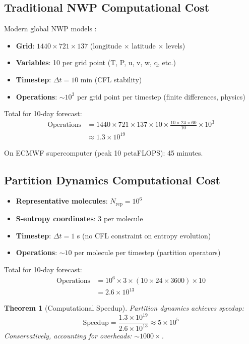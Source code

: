 \documentclass[twocolumn,10pt,a4paper]{article}
\newtheorem{theorem}{Theorem}[section]
\theoremstyle{definition}
\theoremstyle{remark}
\begin{document}
\subsection{Traditional NWP Computational Cost}

Modern global NWP models \cite{ecmwf2020ifs}:
\begin{itemize}
    \item \textbf{Grid}: $1440 \times 721 \times 137$ (longitude $\times$ latitude $\times$ levels)
    \item \textbf{Variables}: 10 per grid point (T, P, u, v, w, q, etc.)
    \item \textbf{Timestep}: $\Delta t = 10$ min (CFL stability)
    \item \textbf{Operations}: $\sim 10^3$ per grid point per timestep (finite differences, physics)
\end{itemize}

Total for 10-day forecast:
\begin{align}
    \text{Operations} &= 1440 \times 721 \times 137 \times 10 \times \frac{10 \times 24 \times 60}{10} \times 10^3 \\
    &\approx 1.3 \times 10^{19}
\end{align}

On ECMWF supercomputer (peak 10 petaFLOPS): 45 minutes.

\subsection{Partition Dynamics Computational Cost}

\begin{itemize}
    \item \textbf{Representative molecules}: $N_{\text{rep}} = 10^6$
    \item \textbf{S-entropy coordinates}: 3 per molecule
    \item \textbf{Timestep}: $\Delta t = 1$ s (no CFL constraint on entropy evolution)
    \item \textbf{Operations}: $\sim 10$ per molecule per timestep (partition operators)
\end{itemize}

Total for 10-day forecast:
\begin{align}
    \text{Operations} &= 10^6 \times 3 \times (10 \times 24 \times 3600) \times 10 \\
    &= 2.6 \times 10^{13}
\end{align}

\begin{theorem}[Computational Speedup]
\label{thm:speedup}
Partition dynamics achieves speedup:
\begin{equation}
    \text{Speedup} = \frac{1.3 \times 10^{19}}{2.6 \times 10^{13}} \approx 5 \times 10^5
\end{equation}
Conservatively, accounting for overheads: $\sim 1000\times$.
\end{theorem}
\end{document}
